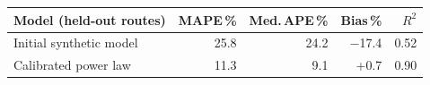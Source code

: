 \begin{tabular}{lrrrr}
\toprule
Model (held-out routes) & MAPE\,\% & Med.\,APE\,\% & Bias\,\% & $R^2$ \\
\midrule
Initial synthetic model & 25.8 & 24.2 & $-$17.4 & 0.52 \\
Calibrated power law & 11.3 & 9.1 & +0.7 & 0.90 \\
\bottomrule
\end{tabular}
